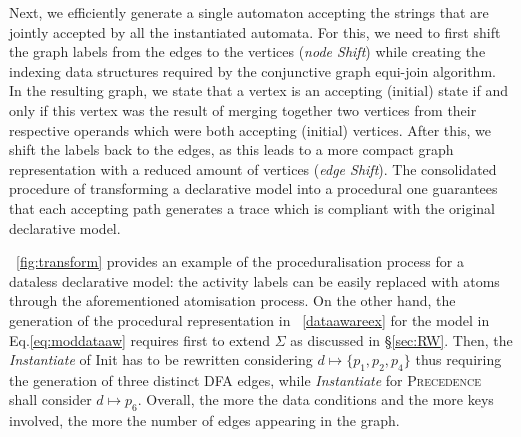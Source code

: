 \documentclass[sigconf]{acmart}
\begin{document}
Next, %
we %
efficiently generate a single automaton accepting the strings that are jointly accepted by all the instantiated automata. For this, we need to first shift the graph labels from the edges to the vertices (\textit{node Shift}) while creating the indexing data structures required by the conjunctive graph equi-join algorithm. %
In the resulting graph, we state that a vertex is an accepting (initial) state if and only if this vertex was the result of merging together two vertices from their respective operands which were both accepting (initial) vertices. After this, we shift the labels back to the edges, as this leads to a more compact graph representation with a reduced amount of vertices (\textit{edge Shift}). The consolidated procedure of transforming a declarative model into a procedural one guarantees that each accepting path generates a trace which is compliant with the original declarative model.

%



\figurename~\ref{fig:transform} provides an example of the proceduralisation process for a dataless declarative model: the activity labels can be easily replaced with atoms through the aforementioned atomisation process. On the other hand, the generation of the procedural representation in \figurename~\ref{dataawareex} for the model in Eq.\ref{eq:moddataaw} requires first to extend $\Sigma$ as discussed in \S\ref{sec:RW}. Then, the \textit{Instantiate} of \textsf{Init} has to be rewritten considering $d\mapsto \{p_1,p_2,p_4\}$ thus requiring the generation of three distinct DFA edges, while \textit{Instantiate} for \textsc{Precedence} shall consider $d\mapsto p_6$. Overall, the more the data conditions and the more keys involved, the more the number of edges appearing in the graph.
\end{document}
